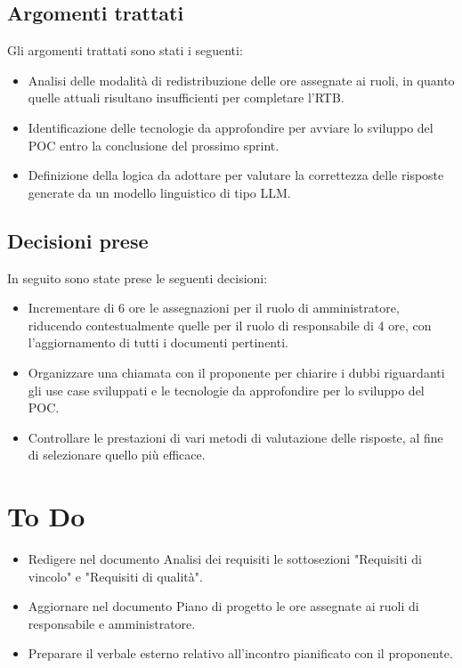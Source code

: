 \documentclass[a4paper, 12pt]{article}
\begin{document}
\subsection{Argomenti trattati}
Gli argomenti trattati sono stati i seguenti:
\begin{itemize}
    \item Analisi delle modalità di redistribuzione delle ore assegnate ai ruoli, in quanto quelle attuali risultano insufficienti per completare l'RTB.
    \item Identificazione delle tecnologie da approfondire per avviare lo sviluppo del POC entro la conclusione del prossimo sprint.
    \item Definizione della logica da adottare per valutare la correttezza delle risposte generate da un modello linguistico di tipo LLM.
\end{itemize}

\subsection{Decisioni prese}
In seguito sono state prese le seguenti decisioni:
\begin{itemize}
    \item Incrementare di 6 ore le assegnazioni per il ruolo di amministratore, riducendo contestualmente quelle per il ruolo di responsabile di 4 ore, con l'aggiornamento di tutti i documenti pertinenti.
    \item Organizzare una chiamata con il proponente per chiarire i dubbi riguardanti gli use case sviluppati e le tecnologie da approfondire per lo sviluppo del POC.
    \item Controllare le prestazioni di vari metodi di valutazione delle risposte, al fine di selezionare quello più efficace.
\end{itemize}

\section{To Do}
\begin{itemize}
    \item Redigere nel documento Analisi dei requisiti le sottosezioni "Requisiti di vincolo" e "Requisiti di qualità".
    \item Aggiornare nel documento Piano di progetto le ore assegnate ai ruoli di responsabile e amministratore.
    \item Preparare il verbale esterno relativo all'incontro pianificato con il proponente.
\end{itemize}
\end{document}
